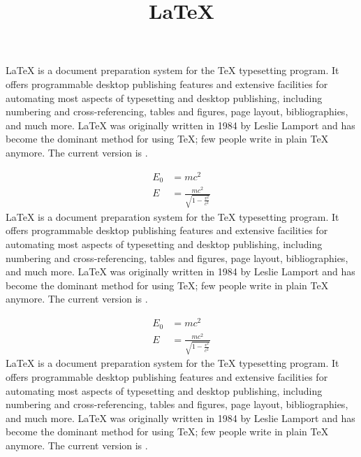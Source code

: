 \documentclass[twoside]{article}
\title{\LaTeX}
\date{}
\begin{document}
  \maketitle
  \LaTeX{} is a document preparation system for the \TeX{}
  typesetting program. It offers programmable desktop
  publishing features and extensive facilities for
  automating most aspects of typesetting and desktop
  publishing, including numbering and cross-referencing,
  tables and figures, page layout, bibliographies, and
  much more. \LaTeX{} was originally written in 1984 by
  Leslie Lamport and has become the dominant method for
  using \TeX; few people write in plain \TeX{} anymore.
  The current version is \LaTeXe.

  \begin{align}
    E_0 &= mc^2                              \\
    E &= \frac{mc^2}{\sqrt{1-\frac{v^2}{c^2}}}
  \end{align}
  \LaTeX{} is a document preparation system for the \TeX{}
  typesetting program. It offers programmable desktop
  publishing features and extensive facilities for
  automating most aspects of typesetting and desktop
  publishing, including numbering and cross-referencing,
  tables and figures, page layout, bibliographies, and
  much more. \LaTeX{} was originally written in 1984 by
  Leslie Lamport and has become the dominant method for
  using \TeX; few people write in plain \TeX{} anymore.
  The current version is \LaTeXe.

  \begin{align}
    E_0 &= mc^2                              \\
    E &= \frac{mc^2}{\sqrt{1-\frac{v^2}{c^2}}}
  \end{align}
  \LaTeX{} is a document preparation system for the \TeX{}
  typesetting program. It offers programmable desktop
  publishing features and extensive facilities for
  automating most aspects of typesetting and desktop
  publishing, including numbering and cross-referencing,
  tables and figures, page layout, bibliographies, and
  much more. \LaTeX{} was originally written in 1984 by
  Leslie Lamport and has become the dominant method for
  using \TeX; few people write in plain \TeX{} anymore.
  The current version is \LaTeXe.
\end{document}
